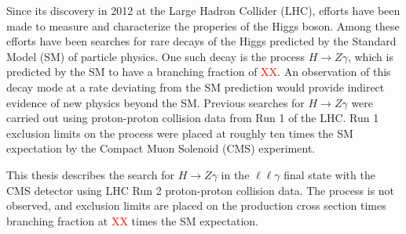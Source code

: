 \abstract
    
    Since its discovery in 2012 at the Large Hadron Collider (LHC), efforts have been made 
to measure and characterize the properies of the Higgs boson. Among these efforts have
been searches for rare decays of the Higgs predicted by the Standard Model (SM) of particle
physics. One such decay is the process $H\rightarrow Z\gamma$, which is predicted
by the SM to have a branching fraction of \textcolor{red}{XX}. An observation 
of this decay mode at a rate deviating from the SM prediction would provide indirect 
evidence of new physics beyond the SM. Previous searches for $H\rightarrow Z\gamma$ 
were carried out using proton-proton collision data from Run 1 of the LHC. Run 1 exclusion
limits on the process were placed at roughly ten times the SM expectation by 
the Compact Muon Solenoid (CMS) experiment. 

    This thesis describes the search for $H\rightarrow Z\gamma$ in the $\ell\ell\gamma$ 
final state with the CMS detector using LHC Run 2 proton-proton collision data. 
The process is not observed, and exclusion limits are placed on the production cross section 
times branching fraction at \textcolor{red}{XX} times the SM expectation.
